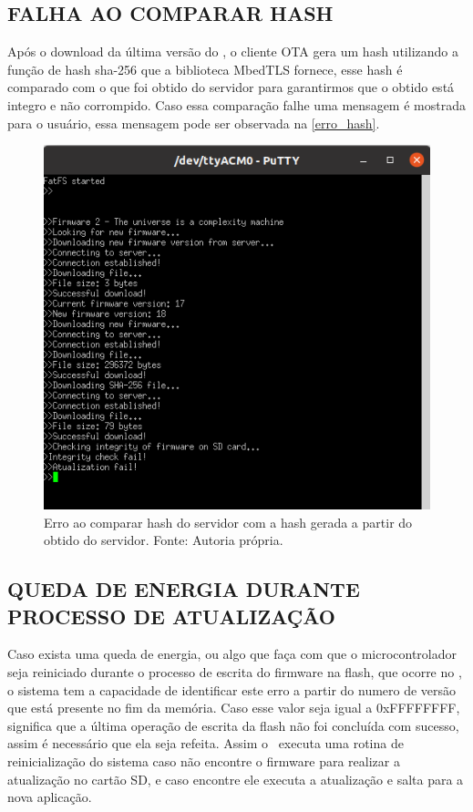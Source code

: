 \subsection{FALHA AO COMPARAR HASH}
Após o download da última versão do \firmware, o cliente OTA gera um hash utilizando a função de hash sha-256 que a biblioteca MbedTLS fornece, esse hash é comparado com o que foi obtido do servidor para garantirmos que o \firmware obtido está integro e não corrompido. Caso essa comparação falhe uma mensagem é mostrada para o usuário, essa mensagem pode ser observada na \autoref{erro_hash}.
\begin{figure}[H]
    \scriptsize
     \centering
     \includegraphics[scale=1.2]{dados/figuras/hash_error.png}
     \caption{Erro ao comparar hash do servidor com a hash gerada a partir do \firmware obtido do servidor. \newline Fonte: Autoria própria.}
     \label{erro_hash}
\end{figure}
\subsection{QUEDA DE ENERGIA DURANTE PROCESSO DE ATUALIZAÇÃO}
Caso exista uma queda de energia, ou algo que faça com que o microcontrolador seja reiniciado durante o processo de escrita do firmware na flash, que ocorre no \bootloader, o sistema tem a capacidade de identificar este erro a partir do numero de versão que está presente no fim da memória. Caso esse valor seja igual a 0xFFFFFFFF, significa que a última operação de escrita da flash não foi concluída com sucesso, assim é necessário que ela seja refeita. Assim o \bootloader\ executa uma rotina de reinicialização do sistema caso não encontre o firmware para realizar a atualização no cartão SD, e caso encontre ele executa a atualização e salta para a nova aplicação.


